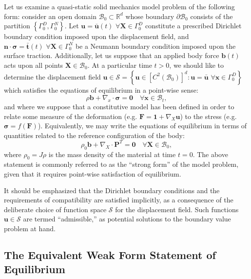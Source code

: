 Let us examine a quasi-static solid mechanics model problem of the following form: consider an open domain $\mathcal{B}_0 \subset \mathbb{R}^d$ whose boundary $\partial \mathcal{B}_0$ consists of the partition $\left\{ \Gamma^D_0, \Gamma^N_0 \right\}$. Let $\mathbf{u} = \bar{\mathbf{u}}(t) \, \, \forall \mathbf{X} \in \Gamma^D_0$ constitute a prescribed Dirichlet boundary condition imposed upon the displacement field, and $\mathbf{n} \cdot \boldsymbol{\sigma} = \bar{\mathbf{t}}(t) \, \, \forall \mathbf{X} \in \Gamma^N_0$ be a Neumann boundary condition imposed upon the surface traction. Additionally, let us suppose that an applied body force $\mathbf{b}(t)$ acts upon all points $\mathbf{X} \in \mathcal{B}_0$. At a particular time $t > 0$, we should like to determine the displacement field $\mathbf{u} \in \mathcal{S} = \left\{ \mathbf{u} \in \left[ C^2 (\mathcal{B}_0) \right]^d \colon \mathbf{u} = \bar{\mathbf{u}} \, \, \forall \mathbf{x} \in \Gamma^D_0 \right\}$ which satisfies the equations of equilibrium in a point-wise sense:
\begin{equation}
  \rho \mathbf{b} + \nabla_x \cdot \boldsymbol{\sigma} = \mathbf{0} \quad \forall \mathbf{x} \in \mathcal{B}_t,
\end{equation}
and where we suppose that a constitutive model has been defined in order to relate some measure of the deformation (e.g. $\mathbf{F} = \mathbf{1} + \nabla_X \mathbf{u}$) to the stress (e.g. $\boldsymbol{\sigma} = f (\mathbf{F})$). Equivalently, we may write the equations of equilibrium in terms of quantities related to the reference configuration of the body:
\begin{equation}
  \rho_0 \mathbf{b} + \nabla_X \cdot \mathbf{P}^T = \mathbf{0} \quad \forall \mathbf{X} \in \mathcal{B}_0,
\end{equation}
where $\rho_0 = J \rho$ is the mass density of the material at time $t = 0$. The above statement is commonly referred to as the ``strong form'' of the model problem, given that it requires point-wise satisfaction of equilibrium.

It should be emphasized that the Dirichlet boundary conditions and the requirements of compatibility are satisfied implicitly, as a consequence of the deliberate choice of function space $\mathcal{S}$ for the displacement field. Such functions $\mathbf{u} \in \mathcal{S}$ are termed ``admissible,'' as potential solutions to the boundary value problem at hand.

\subsection*{The Equivalent Weak Form Statement of Equilibrium}

